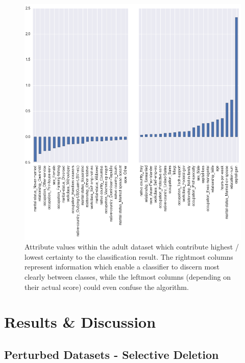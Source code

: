 \documentclass{llncs}
\begin{document}
\begin{figure}[!h]
	\begin{center}
    	\hspace*{-0.8cm}
		\includegraphics[width=1.1\textwidth]{figures/theory/important_columns_cut}
		\caption{Attribute values within the adult dataset which contribute highest / lowest certainty to the classification result. The rightmost columns represent information which enable a classifier to discern most clearly between classes, while the leftmost columns (depending on their actual score) could even confuse the algorithm. }
		\label{fig:adult_important_columns}
	\end{center}
\end{figure}


\section{Results \& Discussion}
\label{sect:results}


\subsection{Perturbed Datasets - Selective Deletion}
\label{ssect:selective_deletion}
\end{document}
